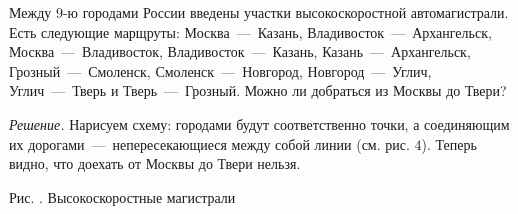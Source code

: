 \begin{example}
	Между $9$-ю городами России введены участки высокоскоростной автомагистрали. Есть следующие марщруты: Москва~---~Казань, Владивосток~---~Архангельск, Москва~---~Владивосток, Владивосток~---~Казань, Казань~---~Архангельск, Грозный~---~Смоленск, Смоленск~---~Новгород, Новгород~---~Углич, Углич~---~Тверь и Тверь~---~Грозный. Можно ли добраться из Москвы до Твери?

	\emph{Решение.} Нарисуем схему: городами будут соответственно точки, а соединяющим их дорогами~---~непересекающиеся между собой линии (см. рис. $4$). Теперь видно, что доехать от Москвы до Твери нельзя.

\begin{center}
\end{center}
\begin{center}
	\small Рис. \images. Высокоскоростные магистрали
\end{center}
\end{example}

